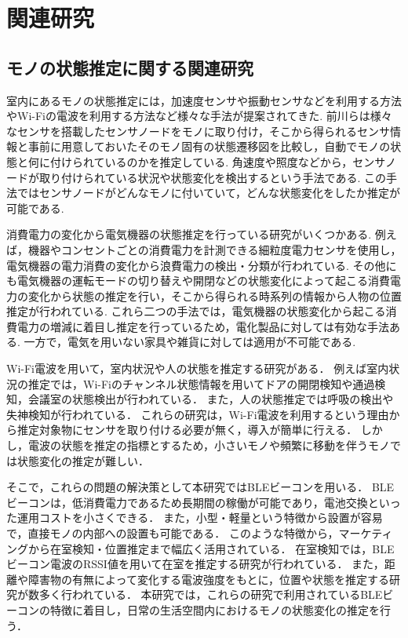 \thispagestyle{myheadings}
\chapter{関連研究}

\section{モノの状態推定に関する関連研究}
室内にあるモノの状態推定には，加速度センサや振動センサなどを利用する方法やWi-Fiの電波を利用する方法など様々な手法が提案されてきた.
前川ら\cite{TagAndThink}は様々なセンサを搭載したセンサノードをモノに取り付け，そこから得られるセンサ情報と事前に用意しておいたそのモノ固有の状態遷移図を比較し，自動でモノの状態と何に付けられているのかを推定している.
角速度や照度などから，センサノードが取り付けられている状況や状態変化を検出するという手法である.
この手法ではセンサノードがどんなモノに付いていて，どんな状態変化をしたか推定が可能である.

消費電力の変化から電気機器の状態推定を行っている研究がいくつかある.
例えば，機器やコンセントごとの消費電力を計測できる細粒度電力センサを使用し，電気機器の電力消費の変化から浪費電力の検出・分類が行われている\cite{sairyu}.
その他にも電気機器の運転モードの切り替えや開閉などの状態変化によって起こる消費電力の変化から状態の推定を行い，そこから得られる時系列の情報から人物の位置推定が行われている\cite{energy}.
これら二つの手法では，電気機器の状態変化から起こる消費電力の増減に着目し推定を行っているため，電化製品に対しては有効な手法ある.
一方で，電気を用いない家具や雑貨に対しては適用が不可能である.

Wi-Fi電波を用いて，室内状況や人の状態を推定する研究がある．
例えば室内状況の推定では，Wi-Fiのチャンネル状態情報を用いてドアの開閉検知\cite{WifiChannel}や通過検知\cite{LANgate}，会議室の状態検出\cite{Room-State}が行われている．
また，人の状態推定では呼吸の検出\cite{Human-Respiration}や失神検知\cite{WiFi-Toilet}が行われている．
これらの研究は，Wi-Fi電波を利用するという理由から推定対象物にセンサを取り付ける必要が無く，導入が簡単に行える．
しかし，電波の状態を推定の指標とするため，小さいモノや頻繁に移動を伴うモノでは状態変化の推定が難しい．

そこで，これらの問題の解決策として本研究ではBLEビーコンを用いる．
BLEビーコンは，低消費電力であるため長期間の稼働が可能であり，電池交換といった運用コストを小さくできる．
また，小型・軽量という特徴から設置が容易で，直接モノの内部への設置も可能である．
このような特徴から，マーケティング\cite{bleUse}から在室検知・位置推定まで幅広く活用されている．
在室検知では，BLEビーコン電波のRSSI値を用いて在室を推定する研究が行われている\cite{home-location, stay-estimation, en-AreaUsed, Finding_by_Counting, dakoku_system, makoto, konzatsu}．
また，距離や障害物の有無によって変化する電波強度をもとに，位置や状態を推定する研究が数多く行われている\cite{move-tracking, BLE-Localization, IoMT, tandem, blespot, en-door}．
本研究では，これらの研究で利用されているBLEビーコンの特徴に着目し，日常の生活空間内におけるモノの状態変化の推定を行う．


